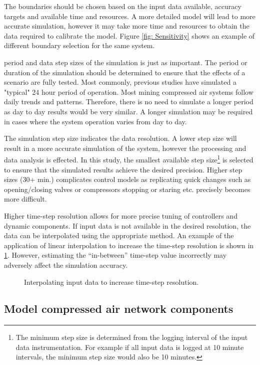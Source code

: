 	\par 
	The boundaries should be chosen based on the input data available, accuracy targets and available time and resources. A more detailed model will lead to more accurate simulation, however it may take more time and resources to obtain the data required to calibrate the model. Figure \cref{fig: Sensitivity} shows an example of different boundary selection for the same system.
	\par
	period and data step sizes of the simulation is just as important. The period or duration of the simulation should be determined to ensure that the effects of a scenario are fully tested. Most commonly, previous studies have simulated a "typical" 24 hour period of operation. Most mining compressed air systems follow daily trends and patterns. Therefore, there is no need to simulate a longer period as day to day results would be very similar. A longer simulation may be required in cases where the system operation varies from day to day. 
	\par 
	The simulation step size indicates the data resolution. A lower step size will result in a more accurate simulation of the system, however the processing and data analysis is effected. In this study, the smallest available step size\footnote{The minimum step size is determined from the logging interval of the input data instrumentation. For example if all input data is logged at 10 minute intervals, the minimum step size would also be 10 minutes.} is selected to ensure that the simulated results achieve the desired precision. Higher step sizes (30+ min.) complicates control models as replicating quick changes such as opening/closing valves or compressors stopping or staring etc. precisely becomes more difficult.
	\par
	Higher time-step resolution allows for more precise tuning of controllers and dynamic components. If input data is not available in the desired resolution, the data can be interpolated using the appropriate method. An example of the application of linear interpolation to increase the time-step resolution is shown in \cref{fig: Inter}. However, estimating the \enquote{in-between} time-step value incorrectly may adversely affect the simulation accuracy.
	
	\begin{figure}[h]
		\centering
		\fbox{}
		\caption{Interpolating input data to increase time-step resolution.}
		\label{fig: Inter}
	\end{figure}
	\subsection{Model compressed air network components}
